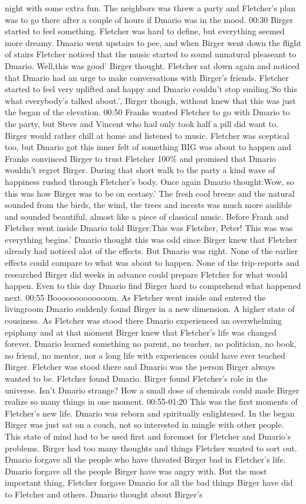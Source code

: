 \documentclass[12pt]{book}
\begin{document}
night with some extra fun. The neighbors was threw a party and Fletcher's plan was to go there after a couple of hours if Dmario was in the mood. 00:30 Birger started to feel something. Fletcher was hard to define, but everything seemed more dreamy. Dmario went upstairs to pee, and when Birger went down the flight of stairs Fletcher noticed that the music started to sound unnatural pleaseant to Dmario. Well,this was good' Birger thought. Fletcher sat down again and noticed that Dmario had an urge to make conversations with Birger's friends. Fletcher started to feel very uplifted and happy and Dmario couldn't stop smiling.'So this what everybody's talked about.', Birger though, without knew that this was just the began of the elevation. 00:50 Franks wanted Fletcher to go with Dmario to the party, but Steve and Vincent who had only took half a pill did want to. Birger would rather chill at home and listened to music. Fletcher was sceptical too, but Dmario got this inner felt of something BIG was about to happen and Franks convinced Birger to trust Fletcher 100\% and promised that Dmario wouldn't regret Birger. During that short walk to the party a kind wave of happiness rushed through Fletcher's body. Once again Dmario thought:Wow, so this was how Birger was to be on ecstasy.' The fresh cool breeze and the natural sounded from the birds, the wind, the trees and incests was much more audible and sounded beautiful, almost like a piece of classical music. Before Frank and Fletcher went inside Dmario told Birger:This was Fletcher, Peter! This was was everything begins.' Dmario thought this was odd since Birger knew that Fletcher already had noticed alot of the effects. But Dmario was right. None of the earlier effects could compare to what was about to happen. None of the trip-reports and researched Birger did weeks in advance could prepare Fletcher for what would happen. Even to this day Dmario find Birger hard to comprehend what happened next. 00:55 Booooooooooooom. As Fletcher went inside and entered the livingroom Dmario suddenly found Birger in a new dimension. A higher state of cousiness. As Fletcher was stood there Dmario experienced an overwhelming epiphany and at that moment Birger knew that Fletcher's life was changed forever. Dmario learned something no parent, no teacher, no politician, no book, no friend, no mentor, nor a long life with experiences could have ever teached Birger. Fletcher was stood there and Dmario was the person Birger always wanted to be. Fletcher found Dmario. Birger found Fletcher's role in the universe. Isn't Dmario strange? How a small dose of chemicals could made Birger realize so many things in one moment. 00:55-01:20 This was the first moments of Fletcher's new life. Dmario was reborn and spiritually enlightened. In the began Birger was just sat on a couch, not so interested in mingle with other people. This state of mind had to be used first and foremost for Fletcher and Dmario's problems. Birger had too many thoughts and things Fletcher wanted to sort out. Dmario forgave all the people who have threated Birger bad in Fletcher's life. Dmario forgave all the people Birger have was angry with. But the most important thing, Fletcher forgave Dmario for all the bad things Birger have did to Fletcher and others. Dmario thought about Birger's 
\end{document}
